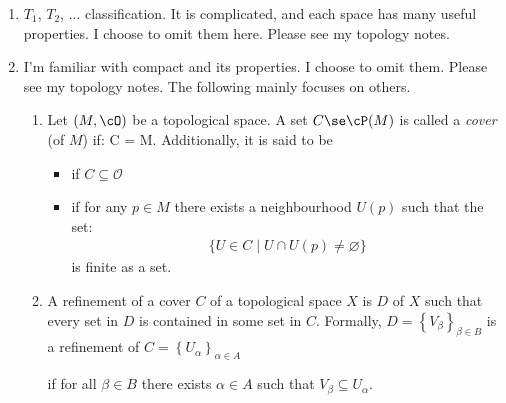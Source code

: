 \documentclass{article}
\begin{document}
\begin{enumerate}
    \item {} $T_1$, $T_2$, ... classification. It is complicated, and each space has many useful properties. I choose to omit them here. Please see my topology notes.
    
    \item {} I'm familiar with compact and its properties. I choose to omit them.  Please see my topology notes. The following mainly focuses on others. 
    \begin{enumerate}
    \item {} Let $(M,\cO)$ be a topological space. A set $C \se \cP(M)$ is called a \emph{cover} (of $M$) if:
\bse
\bigcup C = M.
\ese
Additionally, it is said to be \begin{itemize}
                \item {} if $C \subseteq \mathcal{O}$
                \item  {} if for any $p \in M$ there exists a neighbourhood $U(p)$ such that the set:
\begin{align*}
\{U \in C \mid U \cap U(p) \neq \varnothing\}
\end{align*}
is finite as a set.  \end{itemize}
        \item {} A refinement of a cover $C$ of a topological space $X$ is  $D$ of $X$ such that every set in $D$ is contained in some set in $C$. Formally, $D=\left\{V_{\beta}\right\}_{\beta \in B}$ is a refinement of $C=\left\{U_{\alpha}\right\}_{\alpha \in A}$
        
        \centerline{if for all $\beta \in B$ there exists $\alpha \in A$ such that $V_{\beta} \subseteq U_{\alpha}$.}
        

\end{enumerate}
\end{enumerate}
\end{document}
